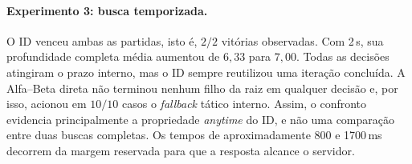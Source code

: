 \documentclass[letterpaper]{article} %
\begin{document}
\begin{table}[t]
\centering
\caption{\textit{Iterative Deepening} (ID) contra Alfa--Beta direta (AB), com $D=42$. $d_{\mathrm{ID}}$ é a profundidade completa média e $F_{\mathrm{AB}}$ conta \textit{fallbacks} internos.}
\label{tab:timed}
\scriptsize
{}
\end{table}

\paragraph{Experimento 3: busca temporizada.}
O ID venceu ambas as partidas, isto é, $2/2$ vitórias observadas. Com 2\,s, sua profundidade completa média aumentou de $6,33$ para $7,00$. Todas as decisões atingiram o prazo interno, mas o ID sempre reutilizou uma iteração concluída. A Alfa--Beta direta não terminou nenhum filho da raiz em qualquer decisão e, por isso, acionou em $10/10$ casos o \textit{fallback} tático interno. Assim, o confronto evidencia principalmente a propriedade \textit{anytime} do ID, e não uma comparação entre duas buscas completas. Os tempos de aproximadamente 800 e 1700\,ms decorrem da margem reservada para que a resposta alcance o servidor.

\begin{table}[t]
\centering
\caption{Versão competitiva contra humano. Todas as partidas foram vencidas pela IA. $\bar t$ e $\bar N$ incluem todas as decisões; $\bar d_s$ considera somente buscas, excluindo o atalho final.}
\label{tab:human}
\scriptsize
{}
\end{table}
\end{document}
